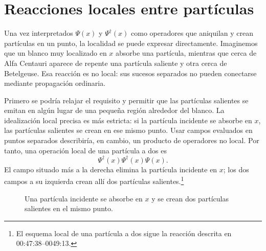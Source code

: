 \begin{classroomqa}
\end{classroomqa}

\section{Reacciones locales entre partículas}

Una vez interpretados \(\Psi(x)\) y \(\Psi^\dagger(x)\) como operadores que aniquilan y crean partículas en un punto, la localidad se puede expresar directamente. Imaginemos que un blanco muy localizado en \(x\) absorbe una partícula, mientras que cerca de Alfa Centauri aparece de repente una partícula saliente y otra cerca de Betelgeuse. Esa reacción es no local: sus sucesos separados no pueden conectarse mediante propagación ordinaria.

Primero se podría relajar el requisito y permitir que las partículas salientes se emitan en algún lugar de una pequeña región alrededor del blanco. La idealización local precisa es más estricta: si la partícula incidente se absorbe en \(x\), las partículas salientes se crean en ese mismo punto. Usar campos evaluados en puntos separados describiría, en cambio, un producto de operadores no local. Por tanto, una operación local de una partícula a dos es
\begin{equation}
\Psi^\dagger(x)\Psi^\dagger(x)\Psi(x).
\end{equation}
El campo situado más a la derecha elimina la partícula incidente en \(x\); los dos campos a su izquierda crean allí dos partículas salientes.\footnote{El esquema local de una partícula a dos sigue la reacción descrita en 00:47:38--0049:13.}

\begin{figure}[t]
\centering
{}
\caption{Una partícula incidente se absorbe en \(x\) y se crean dos partículas salientes en el mismo punto.}
\end{figure}


